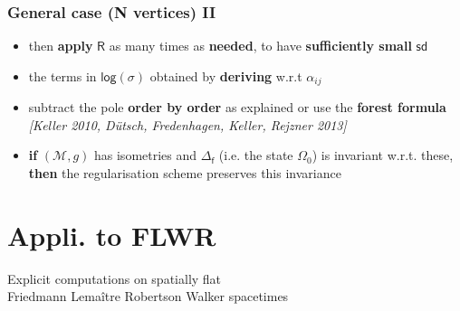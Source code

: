 \documentclass[9pt]{beamer}
\newcommand{\logar}{\mathsf{log}} %
\newcommand{\sd}{\mathsf{sd}} %
\newcommand{\citebeam}[1]{\textit{\textcolor{black!60!white}{[#1]}}} %
\newcommand{\Mcal}{\mathcal{M}}
\newcommand{\Rsf}{\mathsf{R}}
\newcommand{\fsf}{\mathsf{f}}
\begin{document}
\begin{frame}
 
\frametitle{General case (N vertices) II}

\begin{itemize}
 
\item then \textbf{apply} $\Rsf$ as many times as \textbf{needed}, to have \textbf{sufficiently small} $\sd$ 

\item the terms in $\logar(\sigma)$ obtained by \textbf{deriving} w.r.t $\alpha_{ij}$

\item subtract the pole \textbf{order by order} as explained or use the \textbf{forest formula} \\
\citebeam{Keller 2010, Dütsch, Fredenhagen, Keller, Rejzner 2013}

\item \textbf{if} $(\Mcal,g)$ has isometries and $\Delta_\fsf$ (i.e. the state $\Omega_0$) is invariant w.r.t. these, \textbf{then} the regularisation scheme preserves this invariance
 
\end{itemize}

\end{frame}

\section{Appli. to FLWR}

{
\begin{frame}
\bf
\begin{exampleblock}{\vspace*{-3ex}}
\begin{center}
\Large Explicit computations on spatially flat \\[10pt] Friedmann Lemaître Robertson Walker spacetimes
\end{center}
\end{exampleblock}
\end{frame}
}
\end{document}
